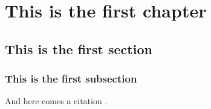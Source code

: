 \chapter{This is the first chapter}
\lipsum
\section{This is the first section}
\lipsum
\subsection{This is the first subsection}
\lipsum
And here comes a citation \cite{lovecraft2016el}.
